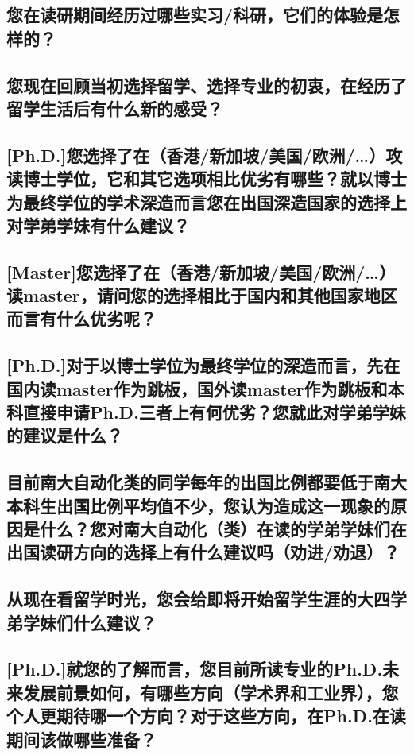 \documentclass[a4paper,UTF8]{book}
\begin{document}
\subsection*{您在读研期间经历过哪些实习/科研，它们的体验是怎样的？}

\subsection*{您现在回顾当初选择留学、选择专业的初衷，在经历了留学生活后有什么新的感受？}

\subsection*{[Ph.D.]您选择了在（香港/新加坡/美国/欧洲/…）攻读博士学位，它和其它选项相比优劣有哪些？就以博士为最终学位的学术深造而言您在出国深造国家的选择上对学弟学妹有什么建议？}

\subsection*{[Master]您选择了在（香港/新加坡/美国/欧洲/…）读master，请问您的选择相比于国内和其他国家地区而言有什么优劣呢？}

\subsection*{[Ph.D.]对于以博士学位为最终学位的深造而言，先在国内读master作为跳板，国外读master作为跳板和本科直接申请Ph.D.三者上有何优劣？您就此对学弟学妹的建议是什么？}

\subsection*{目前南大自动化类的同学每年的出国比例都要低于南大本科生出国比例平均值不少，您认为造成这一现象的原因是什么？您对南大自动化（类）在读的学弟学妹们在出国读研方向的选择上有什么建议吗（劝进/劝退）？}

\subsection*{从现在看留学时光，您会给即将开始留学生涯的大四学弟学妹们什么建议？}

\subsection*{[Ph.D.]就您的了解而言，您目前所读专业的Ph.D.未来发展前景如何，有哪些方向（学术界和工业界），您个人更期待哪一个方向？对于这些方向，在Ph.D.在读期间该做哪些准备？}
\end{document}
